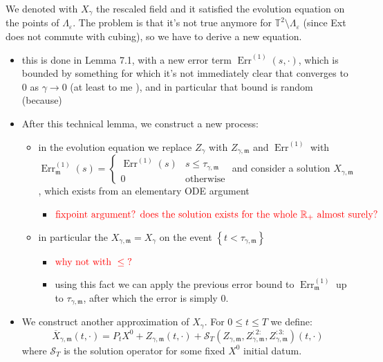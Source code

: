 \documentclass{report}
\theoremstyle{remark}
\theoremstyle{definition}
\let\epsilon\varepsilon
\begin{document}
We denoted with $X_\gamma$ the rescaled field and it satisfied the evolution equation on the points of $\Lambda_\epsilon$. The problem is that it's not true anymore for $\mathbb{T}^2 \setminus \Lambda_\epsilon$ (since Ext does not commute with cubing), so we have to derive a new equation.
\begin{itemize}
  \item this is done in Lemma 7.1, with a new error term $\operatorname{Err}^{(1)}(s, \cdot)$, which is bounded by something for which it's not immediately clear that converges to $0$ as $\gamma \to 0$ (at least to me ), and in particular that bound is random (because)
  \item After this technical lemma, we construct a new process:
  \begin{itemize}
    \item in the evolution equation we replace $Z_\gamma$ with $Z_{\gamma, \mathfrak{m}}$ and $\operatorname{Err}^{(1)}$ with $\operatorname{Err}^{(1)}_\mathfrak{m}(s) = \begin{cases}\operatorname{Err}^{(1)}(s)&s \le \tau_{\gamma, \mathfrak{m}}\\ 0 &\text{otherwise}\end{cases}$  and consider a solution $X_{\gamma, \mathfrak{m}}$, which  exists from an elementary ODE argument 
    \begin{itemize}
      \item $\textcolor{red}{\text{fixpoint argument? does the solution exists for the whole } \mathbb{R}_+ \text{ almost surely?}}$  
    \end{itemize}
    \item in particular the $X_{\gamma, \mathfrak{m}} = X_\gamma$ on the event $\left\{ t < \tau_{\gamma, \mathfrak{m}}\right\}$ 
    \begin{itemize}
      \item $\textcolor{red}{\text{why not with }\le\text{?}}$ 
      \item using this fact we can apply the previous error bound to $\operatorname{Err}^{(1)}_\mathfrak{m}$  up to $\tau_{\gamma, \mathfrak{m}}$, after which the error is simply $0$.
    \end{itemize}
  \end{itemize}
  \item We construct another approximation of $X_\gamma$. For $0 \le t \le T$ we define:$$\overline{X}_{\gamma, \mathfrak{m}}(t, \cdot) = P_t X^0 + Z_{\gamma, \mathfrak{m}}(t, \cdot) + \mathcal{S}_T(Z_{\gamma, \mathfrak{m}}, Z^{:2:}_{\gamma, \mathfrak{m}}, Z_{\gamma, \mathfrak{m}}^{:3:})(t, \cdot)$$where $\mathcal{S}_T$ is the solution operator for some fixed $X^0$ initial datum. 

\end{itemize}
\end{document}
